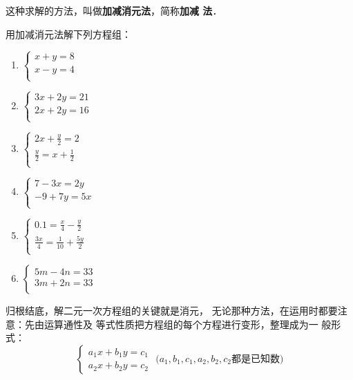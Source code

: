 这种求解的方法，叫做\textbf{加减消元法}，简称\textbf{加减
法}．

\begin{ex}
    用加减消元法解下列方程组：
\begin{multicols}{2}
\begin{enumerate}
    \item $\begin{cases}
        x  +  y  = 8  \\ x  -  y  = 4  \\
    \end{cases}$
    \item $\begin{cases}
       3 x  +  2y  =21   \\ 2x  + 2 y  = 16  \\
    \end{cases}$
    \item $\begin{cases}
       2 x  +  \frac{y}{2}  = 2  \\ \frac{y}{2} =x +\frac{1}{2}       \\
    \end{cases}$
    \item $\begin{cases}
      7- 3 x =2  y    \\ -9+ 7 y  =5x   \\
    \end{cases}$
    \item $\begin{cases}
       0.1=\frac{x}{4} -\frac{y}{2}   \\ \frac{3x}{4}=\frac{1}{10}+\frac{5y}{2}   \\
    \end{cases}$
    \item $\begin{cases}
      5m-4n  = 33  \\3m+2n= 33  \\
    \end{cases}$
\end{enumerate}
\end{multicols}
\end{ex}

归根结底，解二元一次方程组的关键就是消元，
无论那种方法，在运用时都要注意：先由运算通性及
等式性质把方程组的每个方程进行变形，整理成为一
般形式：
\[\begin{cases}
    a_1x+b_1y=c_1\\
    a_2x+b_2y=c_2
\end{cases} \text{ ($a_1,b_1,c_1,a_2,b_2,c_2$都是已知数)}\]

